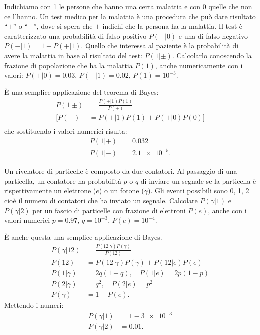 
\begin{exercise}
	Indichiamo con 1 le persone che hanno una certa malattia e con 0 quelle che non ce l'hanno.
	Un test medico per la malattia è una procedura che può dare risultato ``$+$'' o ``$-$'',
	dove si spera che $+$ indichi che la persona ha la malattia.
	Il test è caratterizzato una probabilità di falso positivo $P(+|0)$ e una di falso negativo
	$P(-|1) = 1 - P(+|1)$.
	Quello che interessa al paziente è la probabilità di avere la malattia in base al risultato del test:
	$P(1|\pm)$. Calcolarlo conoscendo la frazione di popolazione che ha la malattia $P(1)$, anche numericamente con i valori: $P(+|0)=0.03$, $P(-|1)=0.02$, $P(1)=10^{-3}$.
\end{exercise}

\begin{solution*}
	È una semplice applicazione del teorema di Bayes:
	\begin{align*}
		P(1|\pm) &= \frac{P(\pm|1) P(1)}{P(\pm)} \\
		\Big[ P(\pm) &= P(\pm|1)P(1) + P(\pm|0)P(0) \Big] \\
	\end{align*}
	che sostituendo i valori numerici risulta:
	\begin{align*}
		P(1|+) &= 0.032 \\
		P(1|-) &= \num{2.1e-5}.
	\end{align*}
\end{solution*}

\begin{exercise}
	Un rivelatore di particelle è composto da due contatori.
	Al passaggio di una particella,
	un contatore ha probabilità $p$ o $q$ di inviare un segnale se la particella è rispettivamente
	un elettrone ($e$) o un fotone ($\gamma$).
	Gli eventi possibili sono 0, 1, 2 cioè il numero di contatori che ha inviato un segnale.
	Calcolare $P(\gamma|1)$ e $P(\gamma|2)$ per un fascio di particelle con frazione di elettroni $P(e)$,
	anche con i valori numerici $p=0.97$, $q=10^{-3}$, $P(e)=10^{-4}$.
\end{exercise}

\begin{solution*}
	È anche questa una semplice applicazione di Bayes.
	\begin{align*}
		P(\gamma|12) &= \frac{P(12|\gamma) P(\gamma)}{P(12)} \\
		P(12) &= P(12|\gamma)P(\gamma) + P(12|e)P(e) \\
		P(1|\gamma) &= 2q(1-q), \quad P(1|e) = 2p(1-p) \\
		P(2|\gamma) &= q^2, \quad P(2|e) = p^2 \\
		P(\gamma) &= 1 - P(e).
	\end{align*}
	Mettendo i numeri:
	\begin{align*}
		P(\gamma|1) &= 1 - \num{3e-3} \\
		P(\gamma|2) &= 0.01.
	\end{align*}
\end{solution*}

